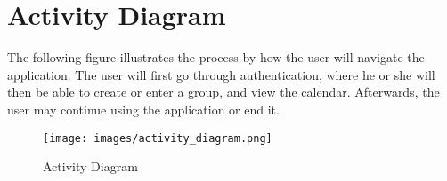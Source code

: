 \chapter{Activity Diagram}
The following figure illustrates the process by how the user will navigate the application. The user will first go through authentication, where he or she will then be able to create or enter a group, and view the calendar. Afterwards, the user may continue using the application or end it.

\begin{figure}[h]
	\centering
	\texttt{[image: images/activity\_diagram.png]}
	\caption{Activity Diagram}
	\label{fig:activity diagram}
\end{figure}